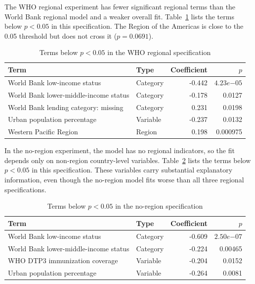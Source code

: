 \documentclass[runningheads]{llncs}
\begin{document}
The WHO regional experiment has fewer significant regional terms than the World Bank regional model and a weaker overall fit. Table~\ref{tab:who-significant-terms} lists the terms below $p < 0.05$ in this specification. The Region of the Americas is close to the 0.05 threshold but does not cross it ($p = 0.0691$).

\begin{table}
\caption{Terms below $p < 0.05$ in the WHO regional specification}
\label{tab:who-significant-terms}
\centering
\renewcommand{\arraystretch}{1.2}
\setlength{\tabcolsep}{7pt}
\begin{tabular}{llrr}
\hline
Term & Type & Coefficient & $p$ \\
\hline
World Bank low-income status & Category & -0.442 & $4.23e{-05}$ \\
World Bank lower-middle-income status & Category & -0.178 & 0.0127 \\
World Bank lending category: missing & Category & 0.231 & 0.0198 \\
Urban population percentage & Variable & -0.237 & 0.0132 \\
Western Pacific Region & Region & 0.198 & 0.000975 \\
\hline
\end{tabular}
\end{table}

In the no-region experiment, the model has no regional indicators, so the fit depends only on non-region country-level variables. Table~\ref{tab:no-region-significant-terms} lists the terms below $p < 0.05$ in this specification. These variables carry substantial explanatory information, even though the no-region model fits worse than all three regional specifications.

\begin{table}
\caption{Terms below $p < 0.05$ in the no-region specification}
\label{tab:no-region-significant-terms}
\centering
\renewcommand{\arraystretch}{1.2}
\setlength{\tabcolsep}{7pt}
\begin{tabular}{llrr}
\hline
Term & Type & Coefficient & $p$ \\
\hline
World Bank low-income status & Category & -0.609 & $2.50e{-07}$ \\
World Bank lower-middle-income status & Category & -0.224 & 0.00465 \\
WHO DTP3 immunization coverage & Variable & -0.204 & 0.0152 \\
Urban population percentage & Variable & -0.264 & 0.0081 \\
\hline
\end{tabular}
\end{table}
\end{document}
